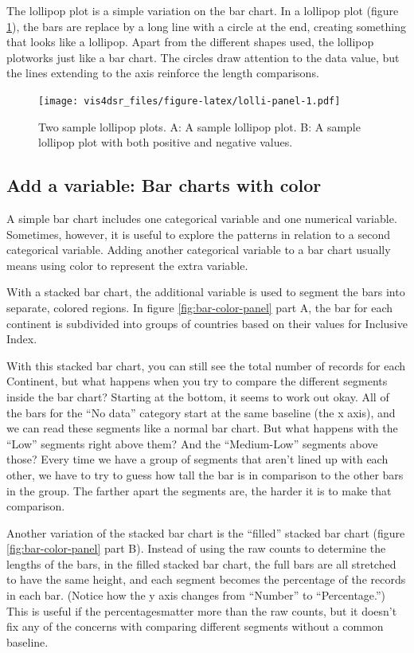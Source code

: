 \documentclass[
]{krantz}
\begin{document}
The lollipop plot is a simple variation on the bar chart. In a lollipop plot
(figure \ref{fig:lolli-panel}), the bars are replace by a long line with a circle
at the end, creating something that looks like a lollipop. Apart from the different
shapes used, the lollipop plotworks just like a bar chart. The circles draw attention
to the data value, but the lines extending to the axis reinforce the length comparisons.

\begin{figure}
\centering
\texttt{[image: vis4dsr\_files/figure-latex/lolli-panel-1.pdf]}
\caption{\label{fig:lolli-panel}Two sample lollipop plots. A: A sample lollipop plot. B: A sample lollipop plot with both positive and negative values.}
\end{figure}

\hypertarget{add-a-variable-bar-charts-with-color}{%
\subsection{Add a variable: Bar charts with color}\label{add-a-variable-bar-charts-with-color}}

A simple bar chart includes one categorical variable and one numerical variable.
Sometimes, however, it is useful to explore the patterns in relation to a second
categorical variable. Adding another categorical variable to a bar chart usually
means using color to represent the extra variable.

With a stacked bar chart, the additional variable is used to segment the bars into
separate, colored regions. In figure \ref{fig:bar-color-panel} part A, the bar for each continent
is subdivided into groups of countries based on their values for Inclusive Index.

With this stacked bar chart, you can still see the total number of records for each Continent,
but what happens when you try to compare the different segments inside the
bar chart? Starting at the bottom, it seems to work out okay. All of the bars
for the ``No data'' category start at the same baseline (the x axis), and we can
read these segments like a normal bar chart. But what happens with the ``Low'' segments
right above them? And the ``Medium-Low'' segments above those? Every time we have
a group of segments that aren't lined up with each other, we have to try to guess
how tall the bar is in comparison to the other bars in the group. The farther
apart the segments are, the harder it is to make that comparison.

Another variation of the stacked bar chart is the ``filled'' stacked bar chart (figure
\ref{fig:bar-color-panel} part B). Instead of using the raw counts to determine the
lengths of the bars, in the filled stacked bar chart, the full bars are all stretched
to have the same height, and each segment becomes the percentage of the records
in each bar. (Notice how the y axis changes from ``Number'' to ``Percentage.'') This
is useful if the percentagesmatter more than the raw counts, but it doesn't fix
any of the concerns with comparing different segments without a common baseline.
\end{document}
